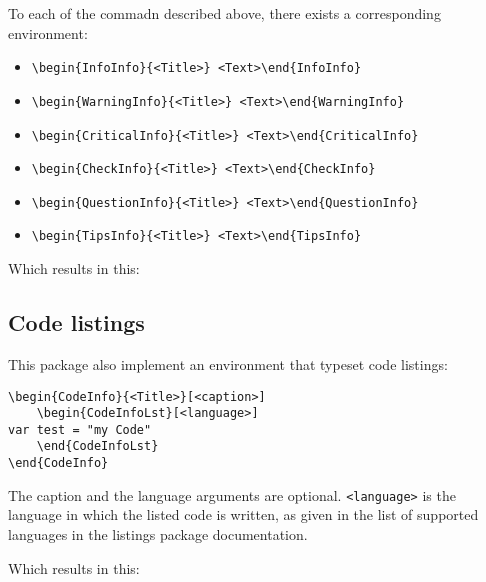 \documentclass[a4paper, 11pt, oneside, fleqn]{article}
\begin{document}
To each of the commadn described above, there exists a corresponding environment:
\begin{itemize}
	\item \verb|\begin{InfoInfo}{<Title>} <Text>\end{InfoInfo}|
	\item \verb|\begin{WarningInfo}{<Title>} <Text>\end{WarningInfo}|
	\item \verb|\begin{CriticalInfo}{<Title>} <Text>\end{CriticalInfo}|
	\item \verb|\begin{CheckInfo}{<Title>} <Text>\end{CheckInfo}|
	\item \verb|\begin{QuestionInfo}{<Title>} <Text>\end{QuestionInfo}|
	\item \verb|\begin{TipsInfo}{<Title>} <Text>\end{TipsInfo}|
\end{itemize}

Which results in this:

\subsection{Code listings}
This package also implement an environment that typeset code listings:
\begin{lstlisting}
\begin{CodeInfo}{<Title>}[<caption>]
	\begin{CodeInfoLst}[<language>]
var test = "my Code"
	\end{CodeInfoLst}
\end{CodeInfo}
\end{lstlisting}

The caption and the language arguments are optional. \verb|<language>| is the language in which the listed code is written, as given in the list of supported languages in the listings package documentation.

Which results in this:
\end{document}
